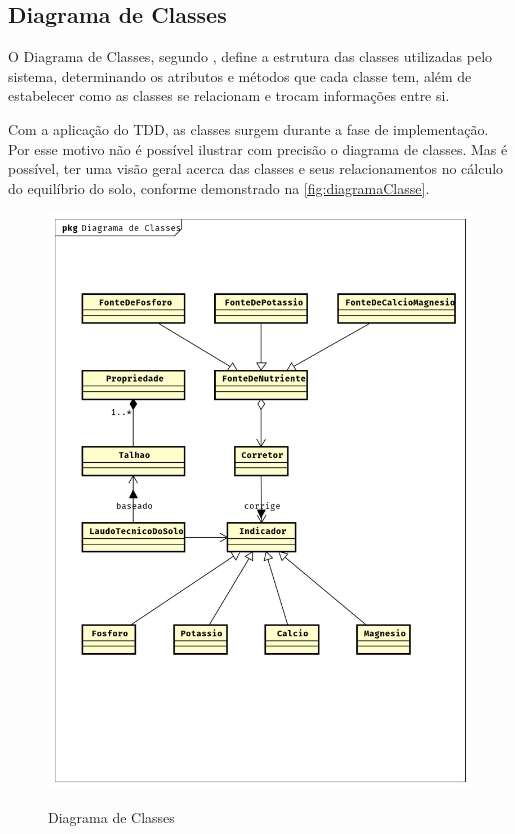 \subsection{Diagrama de Classes}
\label{sec:titSecDiagClasse}

O Diagrama de Classes, segundo , define a estrutura das classes utilizadas pelo sistema, determinando os atributos e métodos que cada classe tem, além de estabelecer como as classes se relacionam e trocam informações entre si.

Com a aplicação do TDD, as classes surgem durante a fase de implementação. Por esse motivo não é possível ilustrar com precisão o diagrama de classes. Mas é possível, ter uma visão geral acerca das classes e seus relacionamentos no cálculo do equilíbrio do solo, conforme demonstrado na \autoref{fig:diagramaClasse}.

\begin{figure}[H]
    \centering
    \caption{Diagrama de Classes}
    \includegraphics[width=13cm]{dados/figuras/diagramaclasse.png}
    \label{fig:diagramaClasse}
\end{figure}